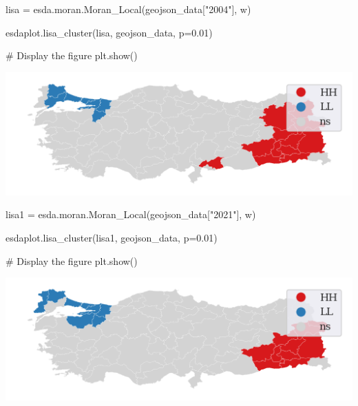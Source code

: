 \documentclass[
  letterpaper,
  DIV=11,
  numbers=noendperiod]{scrreprt}
\newenvironment{Shaded}{\begin{snugshade}}{\end{snugshade}}
\newcommand{\CommentTok}[1]{\textcolor[rgb]{0.37,0.37,0.37}{#1}}
\newcommand{\FloatTok}[1]{\textcolor[rgb]{0.68,0.00,0.00}{#1}}
\newcommand{\NormalTok}[1]{\textcolor[rgb]{0.00,0.23,0.31}{#1}}
\newcommand{\OperatorTok}[1]{\textcolor[rgb]{0.37,0.37,0.37}{#1}}
\newcommand{\StringTok}[1]{\textcolor[rgb]{0.13,0.47,0.30}{#1}}
\begin{document}
\begin{Shaded}
\begin{Highlighting}[]
\NormalTok{lisa }\OperatorTok{=}\NormalTok{ esda.moran.Moran\_Local(geojson\_data[}\StringTok{"2004"}\NormalTok{], w)}
\end{Highlighting}
\end{Shaded}

\begin{Shaded}
\begin{Highlighting}[]
\NormalTok{esdaplot.lisa\_cluster(lisa, geojson\_data, p}\OperatorTok{=}\FloatTok{0.01}\NormalTok{)}


\CommentTok{\# Display the figure}
\NormalTok{plt.show()}
\end{Highlighting}
\end{Shaded}

\includegraphics{labs/dani_style_informal_files/figure-pdf/cell-20-output-1.png}

\begin{Shaded}
\begin{Highlighting}[]
\NormalTok{lisa1 }\OperatorTok{=}\NormalTok{ esda.moran.Moran\_Local(geojson\_data[}\StringTok{"2021"}\NormalTok{], w)}
\end{Highlighting}
\end{Shaded}

\begin{Shaded}
\begin{Highlighting}[]
\NormalTok{esdaplot.lisa\_cluster(lisa1, geojson\_data, p}\OperatorTok{=}\FloatTok{0.01}\NormalTok{)}


\CommentTok{\# Display the figure}
\NormalTok{plt.show()}
\end{Highlighting}
\end{Shaded}

\includegraphics{labs/dani_style_informal_files/figure-pdf/cell-22-output-1.png}
\end{document}
